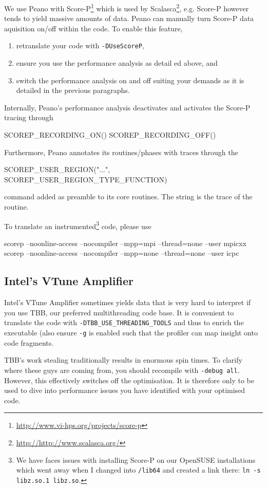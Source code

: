 We use Peano with Score-P\footnote{\url{http://www.vi-hps.org/projects/score-p}}
which is used by Scalasca\footnote{\url{http://http://www.scalasca.org/}}, e.g.
Score-P however tends to yield massive amounts of data. 
Peano can manually turn Score-P data aquisition on/off within the code. 
To enable this feature,
\begin{enumerate}
  \item retranslate your code with \texttt{-DUseScoreP},
  \item ensure you use the performance analysis as detail ed above, and
  \item switch the performance analysis on and off suiting your demands as it is
  detailed in the previous paragraphs.
\end{enumerate}


\noindent
Internally, Peano's performance analysis deactivates and activates the Score-P
tracing through
\begin{code}
SCOREP_RECORDING_ON()
SCOREP_RECORDING_OFF()
\end{code}

\noindent 
Furthermore, Peano annotates its routines/phases with traces through the 
\begin{code} 
SCOREP_USER_REGION("...", SCOREP_USER_REGION_TYPE_FUNCTION)
\end{code}
command added as preamble to its core routines. 
The string is the trace of the routine.


To translate an instrumented\footnote{
  We have faces issues with installing Score-P on our OpenSUSE installations which went away when I changed into 
  \texttt{/lib64} and created a link there: \texttt{ln -s libz.so.1 libz.so}.
} 
code, please use
\begin{code}
scorep --noonline-access --nocompiler --mpp=mpi  --thread=none --user mpicxx
scorep --noonline-access --nocompiler --mpp=none  --thread=none --user icpc
\end{code}


\subsection*{Intel's VTune Amplifier}

Intel's VTune Amplifier sometimes yields data that is very hard to interpret if
you use TBB, our preferred multithreading code base. 
It is convenient to translate the code with \linebreak
\texttt{-DTBB\_USE\_THREADING\_TOOLS} and thus to enrich the executable (also
ensure \texttt{-g} is enabled such that the profiler can map insight onto code
fragments.


TBB's work stealing traditionally results in enormous spin times. To clarify
where these guys are coming from, you should recompile with \texttt{-debug all}.
However, this effectively switches off the optimisation. It is therefore only to
be used to dive into performance issues you have identified with your optimised
code.


